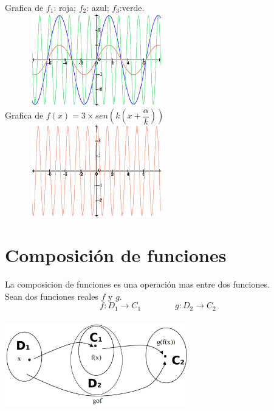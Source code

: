 \begin{minipage}{.45\textwidth}

Grafica de  $f_1$: roja; $f_2$: azul; $f_3$:verde. \\
\includegraphics[height=4cm,width=8cm]{fsnd1.eps} \\

Grafica de  $f(x)=3 \times sen\left(k\left(x+\dfrac{\alpha}{k}\right) \right)$ \\
\includegraphics[height=4cm,width=8cm]{fsnd2.eps} \\

\end{minipage}
\hfill
\newpage
\section{Composición de funciones}

\hfill
\begin{minipage}{.45\textwidth}
La composicion de funciones es una operación mas entre dos funciones.\\

Sean dos funciones reales $f$ y $g$.
$$f:D_1\longrightarrow C_1 \qquad \qquad g: D_2 \longrightarrow C_2$$

\end{minipage}
\hfill
\begin{minipage}{.45\textwidth}
\includegraphics[height=4cm,width=8cm]{cnmpp.eps} 
\end{minipage}
\hfill

